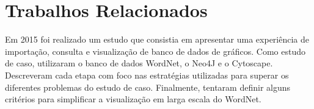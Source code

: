 \section{Trabalhos Relacionados}

Em 2015 foi realizado um estudo \cite{caldarola2015big} que consistia em apresentar uma experiência de importação, consulta e visualização de banco de dados de gráficos. Como estudo de caso, utilizaram o banco de dados WordNet, o Neo4J e o Cytoscape. Descreveram cada etapa com foco nas estratégias utilizadas para superar os diferentes problemas do estudo de caso. Finalmente, tentaram definir alguns critérios para simplificar a visualização em larga escala do WordNet.
  